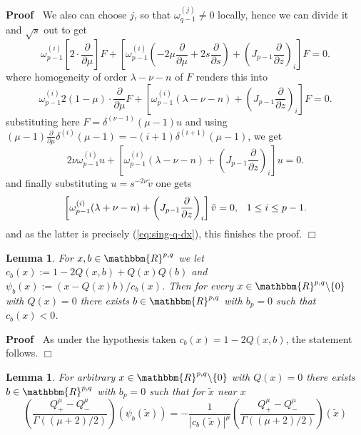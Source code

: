 \documentclass{article}
\newcommand{\assign}{:=}
\renewenvironment{proof}{\noindent\textbf{Proof\ }}{\hspace*{\fill}$\Box$\medskip}
\newtheorem{lemma}[proposition]{Lemma}
\theoremstyle{remark}
\begin{document}
\begin{proof}
  We also can choose $j$, so that $\omega^{(j)}_{q - 1} \neq 0$ locally, hence
  we can divide it and $\sqrt{s}$ out to get
  \[ \omega^{(i)}_{p - 1}  \left[ 2 \cdot \frac{\partial}{\partial \mu}
     \right] F + \left[ \omega_{p - 1}^{(i)}  \left( - 2 \mu
     \frac{\partial}{\partial \mu} + 2 s \frac{\partial}{\partial s} \right) +
     \left( J_{p - 1}  \frac{\partial}{\partial z} \right)_i \right] F = 0. \]
  where homogeneity of order $\lambda - \nu - n$ of $F$ renders this into
  \[ \omega^{(i)}_{p - 1} 2 (1 - \mu) \cdot \frac{\partial}{\partial \mu} F +
     \left[ \omega_{p - 1}^{(i)}  (\lambda - \nu - n) + \left( J_{p - 1} 
     \frac{\partial}{\partial z} \right)_i \right] F = 0. \]
  substituting here $F = \delta^{(\nu - 1)}  (\mu - 1) u$ and using $(\mu - 1)
  \frac{\partial}{\partial \mu} \delta^{(i)}  (\mu - 1) = - (i + 1)
  \delta^{(i + 1)}  (\mu - 1)$, we get
  \[ 2 \nu \omega^{(i)}_{p - 1} u + \left[ \omega_{p - 1}^{(i)}  (\lambda -
     \nu - n) + \left( J_{p - 1}  \frac{\partial}{\partial z} \right)_i
     \right] u = 0. \]
  and finally substituting $u = s^{- 2 \nu}  \tilde{v}$ one gets
  \[ \left[ \omega_{p - 1}^{(i)}  (\lambda + \nu - n) + \left( J_{p - 1} 
     \frac{\partial}{\partial z} \right)_i \right]  \tilde{v} = 0,
     \hspace{0.75em} 1 \leq i \leq p - 1. \]
  and as the latter is precisely (\ref{eq:sing-q-dx}), this finishes the
  proof.
\end{proof}

\begin{lemma}
  \label{supp-Q:lem-flip}For $x, b \in \mathbbm{R}^{p, q}$ we let $c_b (x)
  \assign 1 - 2 Q (x, b) + Q (x) Q (b)$ and $\psi_b (x) \assign (x - Q (x) b)
  / c_b (x)$. Then for every $x \in \mathbbm{R}^{p, q} \backslash \{ 0 \}$
  with $Q (x) = 0$ there exists $b \in \mathbbm{R}^{p, q}$ with $b_p = 0$ such
  that $c_b (x) < 0$.
\end{lemma}

\begin{proof}
  As under the hypothesis taken $c_b (x) = 1 - 2 Q (x, b)$, the statement
  follows.
\end{proof}

\begin{lemma}
  \label{supp-Q:lem-sing-q-7-aux}For arbitrary $x \in \mathbbm{R}^{p, q}
  \backslash \{ 0 \}$ with $Q (x) = 0$ there exists $b \in \mathbbm{R}^{p, q}$
  with $b_p = 0$ such that for $\tilde{x}$ near $x$
  \[ \left( \frac{Q_+^{\mu} - Q_-^{\mu}}{\Gamma ((\mu + 2) / 2)} \right)
     (\psi_b (\tilde{x})) = - \frac{1}{| c_b (\tilde{x}) |^{\mu}} \left(
     \frac{Q_+^{\mu} - Q_-^{\mu}}{\Gamma ((\mu + 2) / 2)} \right) (\tilde{x})
  \]
\end{lemma}
\end{document}
